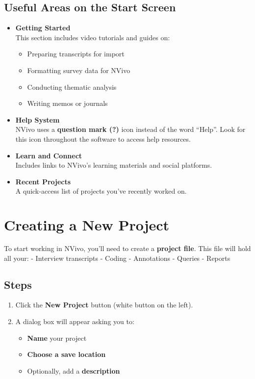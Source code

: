 \documentclass[
  letterpaper,
  DIV=11,
  numbers=noendperiod]{scrreprt}
\providecommand{\tightlist}{%
  \setlength{\itemsep}{0pt}\setlength{\parskip}{0pt}}\usepackage{longtable,booktabs,array}
\begin{document}
\subsection{Useful Areas on the Start
Screen}\label{useful-areas-on-the-start-screen}

\begin{itemize}
\item
  \textbf{Getting Started}\\
  This section includes video tutorials and guides on:

  \begin{itemize}
  \tightlist
  \item
    Preparing transcripts for import
  \item
    Formatting survey data for NVivo
  \item
    Conducting thematic analysis
  \item
    Writing memos or journals
  \end{itemize}
\item
  \textbf{Help System}\\
  NVivo uses a \textbf{question mark (?)} icon instead of the word
  ``Help''. Look for this icon throughout the software to access help
  resources.
\item
  \textbf{Learn and Connect}\\
  Includes links to NVivo's learning materials and social platforms.
\item
  \textbf{Recent Projects}\\
  A quick-access list of projects you've recently worked on.
\end{itemize}

\section{Creating a New Project}\label{creating-a-new-project}

To start working in NVivo, you'll need to create a \textbf{project
file}. This file will hold all your: - Interview transcripts - Coding -
Annotations - Queries - Reports

\subsection{Steps}\label{steps}

\begin{enumerate}
\def\labelenumi{\arabic{enumi}.}
\tightlist
\item
  Click the \textbf{New Project} button (white button on the left).
\item
  A dialog box will appear asking you to:

  \begin{itemize}
  \tightlist
  \item
    \textbf{Name} your project
  \item
    \textbf{Choose a save location}
  \item
    Optionally, add a \textbf{description}
  \end{itemize}
\end{enumerate}
\end{document}
